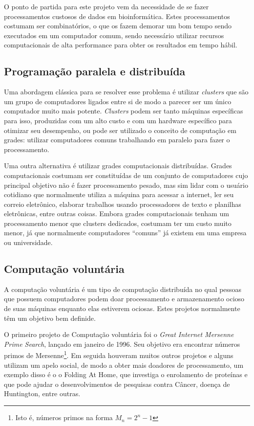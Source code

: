 O ponto de partida para este projeto vem da necessidade de se fazer processamentos custosos de 
dados em bioinformática. Estes processamentos costumam ser combinatórios, o que os fazem
demorar um bom tempo sendo executados em um computador comum, sendo necessário utilizar recursos
computacionais de alta performance para obter os resultados em tempo hábil.

\subsection{Programação paralela e distribuída}

Uma abordagem clássica para se resolver esse problema é utilizar \textit{clusters} que são um grupo de computadores
ligados entre si de modo a parecer ser um único computador muito mais potente. \textit{Clusters} podem ser tanto máquinas
específicas para isso, produzidas com um alto custo e com um hardware específico para otimizar seu desempenho, ou 
pode ser utilizado o conceito de computação em grades: utilizar computadores comuns trabalhando em paralelo 
para fazer o processamento. 

Uma outra alternativa é utilizar grades computacionais distribuídas. Grades computacionais costumam ser constituídas
de um conjunto de computadores cujo principal objetivo não é fazer processamento pesado, mas sim lidar com o usuário 
cotidiano que normalmente utiliza a máquina para acessar a internet, ler seu correio eletrônico, elaborar
trabalhos usando processadores de texto e planilhas eletrônicas, entre outras coisas. Embora grades computacionais tenham um 
processamento menor que clusters dedicados, costumam ter um custo muito menor, já que normalmente computadores ``comuns'' já existem em
uma empresa ou universidade. 


\subsection{Computação voluntária}


A computação voluntária é um tipo de computação distribuída no qual pessoas que possuem computadores podem doar processamento e
armazenamento ocioso de suas máquinas enquanto elas estiverem ociosas. Estes projetos normalmente têm um objetivo bem definide.

O primeiro projeto de Computação voluntária foi o \textit{Great Internet Mersenne Prime Search}, lançado em janeiro de 1996. 
Seu objetivo era encontrar números primos de Mersenne\footnote{Isto é, números primos na forma $M_n = 2^n - 1$}. Em seguida houveram 
muitos outros projetos e alguns utilizam um apelo social, de modo a obter mais doadores de processamento, um exemplo disso é o
o Folding At Home, que investiga o enrolamento de proteínas e que pode ajudar o desenvolvimentos de pesquisas contra 
Câncer, doença de Huntington, entre outras. 

